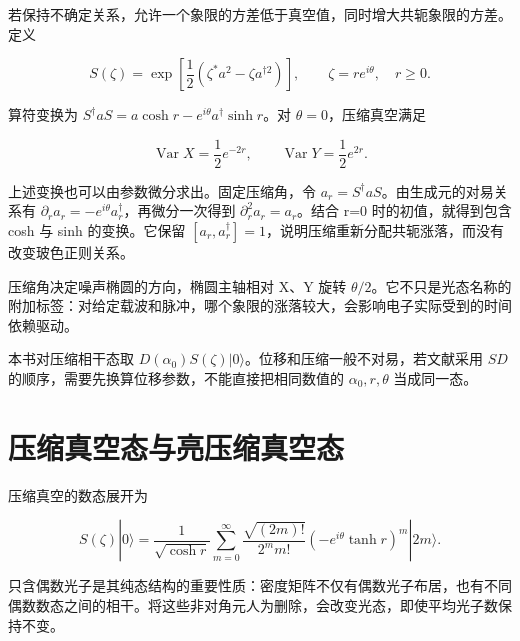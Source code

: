 \documentclass[UTF8,a4paper,zihao=-4,openany,fontset=fandol]{ctexbook}
\begin{document}
若保持不确定关系，允许一个象限的方差低于真空值，同时增大共轭象限的方差。定义



\begin{equation*}
S(\zeta)=\exp\!\left[\frac12
\left(\zeta^*a^2-\zeta a^{\dagger2}\right)\right],\qquad
\zeta=re^{i\theta},\quad r\ge0.
\tag{2.8}\label{eq:2.8}
\end{equation*}


算符变换为 $S^\dagger aS=a\cosh r-e^{i\theta}a^\dagger\sinh r$。对 $\theta=0$，压缩真空满足



\begin{equation*}
\operatorname{Var}X=\frac12e^{-2r},\qquad
\operatorname{Var}Y=\frac12e^{2r}.
\tag{2.9}\label{eq:2.9}
\end{equation*}


上述变换也可以由参数微分求出。固定压缩角，令 $a_r=S^\dagger aS$。由生成元的对易关系有 $\partial_ra_r=-e^{i\theta}a_r^\dagger$，再微分一次得到 $\partial_r^2a_r=a_r$。结合 r=0 时的初值，就得到包含 cosh 与 sinh 的变换。它保留 $[a_r,a_r^\dagger]=1$，说明压缩重新分配共轭涨落，而没有改变玻色正则关系。



压缩角决定噪声椭圆的方向，椭圆主轴相对 X、Y 旋转 $\theta/2$。它不只是光态名称的附加标签：对给定载波和脉冲，哪个象限的涨落较大，会影响电子实际受到的时间依赖驱动。



本书对压缩相干态取 $D(\alpha_0)S(\zeta)|0\rangle$。位移和压缩一般不对易，若文献采用 $S D$ 的顺序，需要先换算位移参数，不能直接把相同数值的 $\alpha_0,r,\theta$ 当成同一态。



\section{压缩真空态与亮压缩真空态}\label{sec:02:7}


压缩真空的数态展开为



\begin{equation*}
S(\zeta)|0\rangle=\frac1{\sqrt{\cosh r}}
\sum_{m=0}^{\infty}
\frac{\sqrt{(2m)!}}{2^m m!}
\left(-e^{i\theta}\tanh r\right)^m|2m\rangle.
\tag{2.10}\label{eq:2.10}
\end{equation*}


只含偶数光子是其纯态结构的重要性质：密度矩阵不仅有偶数光子布居，也有不同偶数数态之间的相干。将这些非对角元人为删除，会改变光态，即使平均光子数保持不变。
\end{document}
